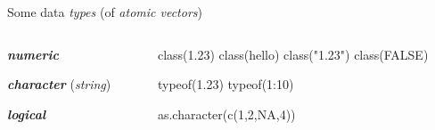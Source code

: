 \documentclass[
  ignorenonframetext,
]{beamer}
\newcommand{\VERB}{\Verb[commandchars=\\\{\}]}
\newenvironment{Shaded}{\begin{snugshade}}{\end{snugshade}}
\newcommand{\ConstantTok}[1]{\textcolor[rgb]{0.00,0.00,0.00}{#1}}
\newcommand{\DecValTok}[1]{\textcolor[rgb]{0.00,0.00,0.81}{#1}}
\newcommand{\FloatTok}[1]{\textcolor[rgb]{0.00,0.00,0.81}{#1}}
\newcommand{\FunctionTok}[1]{\textcolor[rgb]{0.00,0.00,0.00}{#1}}
\newcommand{\NormalTok}[1]{#1}
\newcommand{\SpecialCharTok}[1]{\textcolor[rgb]{0.00,0.00,0.00}{#1}}
\newcommand{\StringTok}[1]{\textcolor[rgb]{0.31,0.60,0.02}{#1}}
\providecommand{\tightlist}{%
  \setlength{\itemsep}{0pt}\setlength{\parskip}{0pt}}
\begin{document}
\begin{frame}[fragile]{Some data \emph{types} (of \emph{atomic
vectors})}
\protect\hypertarget{some-data-types-of-atomic-vectors}{}
\begin{columns}[c]
\begin{column}{0.45\textwidth}
\begin{block}{\textbf{\emph{numeric}}}
\protect\hypertarget{numeric}{}
\end{block}

\begin{block}{\textbf{\emph{character}} (\emph{string})}
\protect\hypertarget{character-string}{}
\end{block}

\begin{block}{\textbf{\emph{logical}}}
\protect\hypertarget{logical}{}
\end{block}
\end{column}

\begin{column}{0.45\textwidth}
\begin{Shaded}
\begin{Highlighting}[]
\FunctionTok{class}\NormalTok{(}\FloatTok{1.23}\NormalTok{)}
\FunctionTok{class}\NormalTok{(}\StringTok{\textquotesingle{}hello\textquotesingle{}}\NormalTok{)}
\FunctionTok{class}\NormalTok{(}\StringTok{"1.23"}\NormalTok{)}
\FunctionTok{class}\NormalTok{(}\ConstantTok{FALSE}\NormalTok{)}

\FunctionTok{typeof}\NormalTok{(}\FloatTok{1.23}\NormalTok{)}
\FunctionTok{typeof}\NormalTok{(}\DecValTok{1}\SpecialCharTok{:}\DecValTok{10}\NormalTok{)}

\FunctionTok{as.character}\NormalTok{(}\FunctionTok{c}\NormalTok{(}\DecValTok{1}\NormalTok{,}\DecValTok{2}\NormalTok{,}\ConstantTok{NA}\NormalTok{,}\DecValTok{4}\NormalTok{))}
\end{Highlighting}
\end{Shaded}
\end{column}
\end{columns}
\end{frame}
\end{document}
